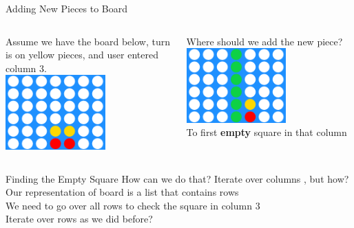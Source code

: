         \begin{frame}{Adding New Pieces to Board}
            \LARGE
            \begin{columns}
                \begin{column}{0.5\textwidth}
                    Assume we have the board below, turn is on yellow pieces, and user entered column 3.\\
                    \bigskip
                    \centering
                    \includegraphics[width=0.6\textwidth]{images/connect_four_board.png}
                \end{column}
                \pause
                \begin{column}{0.5\textwidth}
                    Where should we add the new piece?\\
                    \pause
                    \bigskip
                    \centering
                    \includegraphics[width=0.6\textwidth]{images/connect_four_board_1.png}\\
                    To first \textbf{empty} square in that column
                \end{column}
            \end{columns}
        \end{frame}

        \begin{frame}{Finding the Empty Square}
            \LARGE
            How can we do that?
            \pause
             Iterate over columns
            \pause
            , but how?\\
            \pause
            Our representation of board is a list that contains rows\\
            We need to go over all rows to check the square in column 3\\
            Iterate over rows as we did before?\\
            \pause
            \inputminted[frame=single,framesep=2pt,lastline=4]{python3}{code-examples/finding_square.py}
        \end{frame}

